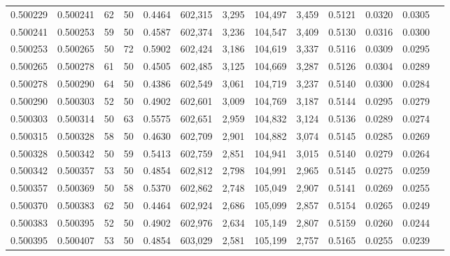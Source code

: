 \begin{tabular}{rrrrrrrrrrrrr}
0.500229 & 0.500241 &    62 &  50 &                                     0.4464 & 602,315 &   3,295 & 104,497 &   3,459 & 0.5121 & 0.0320 & 0.0305 \\
0.500241 & 0.500253 &    59 &  50 &                                     0.4587 & 602,374 &   3,236 & 104,547 &   3,409 & 0.5130 & 0.0316 & 0.0300 \\
0.500253 & 0.500265 &    50 &  72 &                                     0.5902 & 602,424 &   3,186 & 104,619 &   3,337 & 0.5116 & 0.0309 & 0.0295 \\
0.500265 & 0.500278 &    61 &  50 &                                     0.4505 & 602,485 &   3,125 & 104,669 &   3,287 & 0.5126 & 0.0304 & 0.0289 \\
0.500278 & 0.500290 &    64 &  50 &                                     0.4386 & 602,549 &   3,061 & 104,719 &   3,237 & 0.5140 & 0.0300 & 0.0284 \\
0.500290 & 0.500303 &    52 &  50 &                                     0.4902 & 602,601 &   3,009 & 104,769 &   3,187 & 0.5144 & 0.0295 & 0.0279 \\
0.500303 & 0.500314 &    50 &  63 &                                     0.5575 & 602,651 &   2,959 & 104,832 &   3,124 & 0.5136 & 0.0289 & 0.0274 \\
0.500315 & 0.500328 &    58 &  50 &                                     0.4630 & 602,709 &   2,901 & 104,882 &   3,074 & 0.5145 & 0.0285 & 0.0269 \\
0.500328 & 0.500342 &    50 &  59 &                                     0.5413 & 602,759 &   2,851 & 104,941 &   3,015 & 0.5140 & 0.0279 & 0.0264 \\
0.500342 & 0.500357 &    53 &  50 &                                     0.4854 & 602,812 &   2,798 & 104,991 &   2,965 & 0.5145 & 0.0275 & 0.0259 \\
0.500357 & 0.500369 &    50 &  58 &                                     0.5370 & 602,862 &   2,748 & 105,049 &   2,907 & 0.5141 & 0.0269 & 0.0255 \\
0.500370 & 0.500383 &    62 &  50 &                                     0.4464 & 602,924 &   2,686 & 105,099 &   2,857 & 0.5154 & 0.0265 & 0.0249 \\
0.500383 & 0.500395 &    52 &  50 &                                     0.4902 & 602,976 &   2,634 & 105,149 &   2,807 & 0.5159 & 0.0260 & 0.0244 \\
0.500395 & 0.500407 &    53 &  50 &                                     0.4854 & 603,029 &   2,581 & 105,199 &   2,757 & 0.5165 & 0.0255 & 0.0239 \\

\end{tabular}
